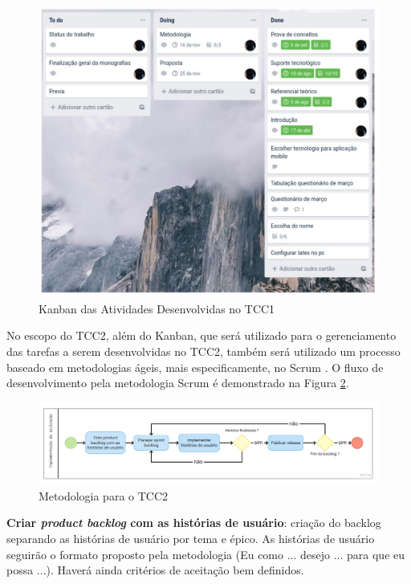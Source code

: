 \begin{figure}[h]
	\centering
	\includegraphics[keepaspectratio=true,scale=0.6]{figuras/kanban.pdf}
	\caption{Kanban das Atividades Desenvolvidas no TCC1 }
        \label{fig04}
\end{figure}

No escopo do TCC2, além do Kanban, que será utilizado para o gerenciamento das tarefas a serem desenvolvidas no TCC2,
também será utilizado um processo baseado em metodologias ágeis, mais especificamente, no Scrum \cite{scrum2017}. O fluxo de desenvolvimento 
pela metodologia Scrum é demonstrado na Figura \ref{fig05}.


\begin{figure}[h]
	\centering
	\includegraphics[keepaspectratio=true,scale=0.3]{figuras/scrummet.pdf}
	\caption{Metodologia para o TCC2}
        \label{fig05}
\end{figure}

\textbf{Criar \emph{product backlog} com as histórias de usuário}: criação do backlog separando as histórias de usuário por tema e épico. As histórias de usuário seguirão 
o formato proposto pela metodologia (Eu como ... desejo ... para que eu possa ...). Haverá ainda critérios de aceitação bem definidos. 

